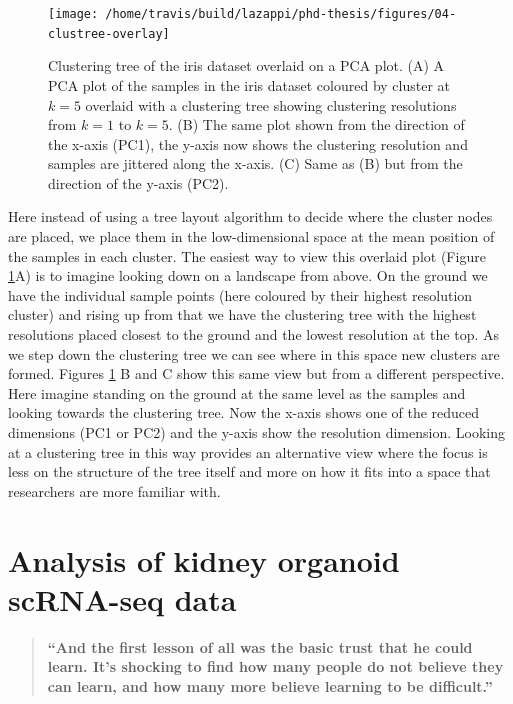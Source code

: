 \documentclass[11pt,a4paper,titlepage,twoside,openright]{style/unimelbthesis}
\theoremstyle{definition}
\theoremstyle{definition}
\theoremstyle{definition}
\theoremstyle{remark}
\begin{document}
\begin{mainmatter}
\begin{figure}

{\centering \texttt{[image: /home/travis/build/lazappi/phd-thesis/figures/04-clustree-overlay]} 

}

\caption[Clustering tree of the iris dataset overlaid on a PCA plot.]{Clustering tree of the iris dataset overlaid on a PCA plot. (A) A PCA plot of the samples in the iris dataset coloured by cluster at \(k = 5\) overlaid with a clustering tree showing clustering resolutions from \(k = 1\) to \(k = 5\). (B) The same plot shown from the direction of the x-axis (PC1), the y-axis now shows the clustering resolution and samples are jittered along the x-axis. (C) Same as (B) but from the direction of the y-axis (PC2).}\label{fig:clustree-overlay}
\end{figure}





Here instead of using a tree layout algorithm to decide where the cluster nodes are placed, we place them in the low-dimensional space at the mean position of the samples in each cluster. The easiest way to view this overlaid plot (Figure \ref{fig:clustree-overlay}A) is to imagine looking down on a landscape from above. On the ground we have the individual sample points (here coloured by their highest resolution cluster) and rising up from that we have the clustering tree with the highest resolutions placed closest to the ground and the lowest resolution at the top. As we step down the clustering tree we can see where in this space new clusters are formed. Figures \ref{fig:clustree-overlay} B and C show this same view but from a different perspective. Here imagine standing on the ground at the same level as the samples and looking towards the clustering tree. Now the x-axis shows one of the reduced dimensions (PC1 or PC2) and the y-axis show the resolution dimension. Looking at a clustering tree in this way provides an alternative view where the focus is less on the structure of the tree itself and more on how it fits into a space that researchers are more familiar with.

\hypertarget{analysis}{%
\chapter{Analysis of kidney organoid scRNA-seq data}\label{analysis}}

\begin{quote}
\textbf{\enquote{And the first lesson of all was the basic trust that he could learn. It's shocking to find how many people do not believe they can learn, and how many more believe learning to be difficult.}}


\end{quote}
\end{mainmatter}
\end{document}
